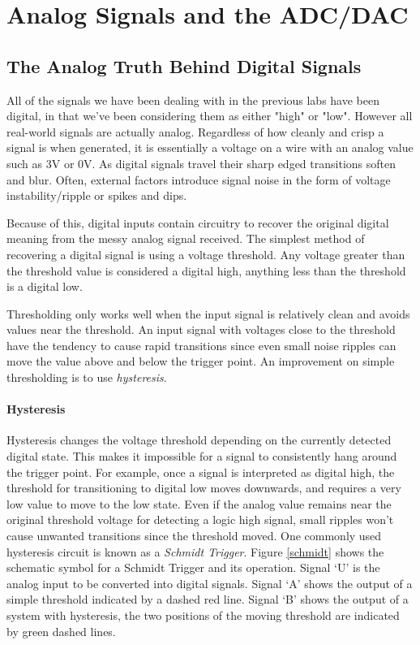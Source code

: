 \documentclass[openany,11pt,fleqn]{book} %
\begin{document}
	
\chapter{Analog Signals and the ADC/DAC}


\section{The Analog Truth Behind Digital Signals}
All of the signals we have been dealing with in the previous labs have been digital, in that we've been considering them as either "high" or "low". However all real-world signals are actually analog. Regardless of how cleanly and crisp a signal is when generated, it is essentially a voltage on a wire with an analog value such as 3V or 0V. As digital signals travel their sharp edged transitions soften and blur. Often, external factors introduce signal noise in the form of voltage instability/ripple or spikes and dips.

Because of this, digital inputs contain circuitry to recover the original digital meaning from the messy analog signal received. The simplest method of recovering a digital signal is using a voltage threshold. Any voltage greater than the threshold value is considered a digital high, anything less than the threshold is a digital low. 

Thresholding only works well when the input signal is relatively clean and avoids values near the threshold. An input signal with voltages close to the threshold have the tendency to cause rapid transitions since even small noise ripples can move the value above and below the trigger point. An improvement on simple thresholding is to use \textit{hysteresis}. 

\subsubsection{Hysteresis}

Hysteresis changes the voltage threshold depending on the currently detected digital state. This makes it impossible for a signal to consistently hang around the trigger point. For example, once a signal is interpreted as digital high, the threshold for transitioning to digital low moves downwards, and requires a very low value to move to the low state. Even if the analog value remains near the original threshold voltage for detecting a logic high signal, small ripples won't cause unwanted transitions since the threshold moved. One commonly used hysteresis circuit is known as a \textit{Schmidt Trigger}. Figure \ref{schmidt} shows the schematic symbol for a Schmidt Trigger and its operation. Signal `U' is the analog input to be converted into digital signals. Signal `A' shows the output of a simple threshold indicated by a dashed red line. Signal `B' shows the output of a system with hysteresis, the two positions of the moving threshold are indicated by green dashed lines. 
\end{document}
